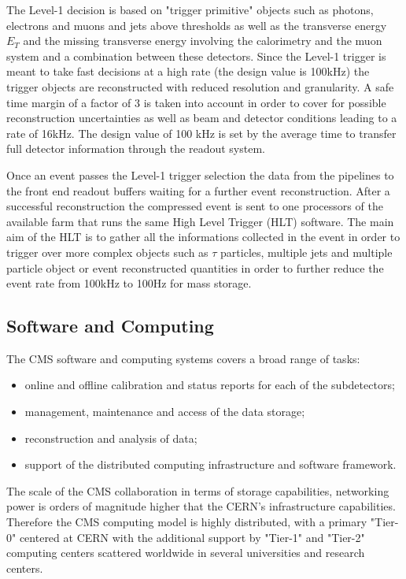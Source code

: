 The Level-1 decision is based on "trigger primitive" objects such as photons, electrons and muons and jets above thresholds as well as the transverse energy $E_{T}$ and the missing transverse energy \met involving the calorimetry and the muon system and a combination between these detectors. Since the Level-1 trigger is meant to take fast decisions at a high rate (the design value is 100kHz) the trigger objects are reconstructed with reduced resolution and granularity. A safe time margin of a factor of 3 is taken into account in order to cover for possible reconstruction uncertainties as well as beam and detector conditions leading to a rate of 16kHz. The design value of 100 kHz is set by the average time to transfer full detector information through the readout system.

Once an event passes the Level-1 trigger selection the data from the pipelines to the front end readout buffers waiting for a further event reconstruction. After a successful reconstruction the compressed event is sent to one processors of the available farm that runs the same High Level Trigger (HLT) software. The main aim of the HLT is to gather all the informations collected in the event in order to trigger over more complex objects such as $\tau$ particles, multiple jets and multiple particle object or event reconstructed quantities in order to further reduce the event rate from 100kHz to 100Hz for mass storage.

\clearpage

\subsection{Software and Computing}

The CMS software and computing systems covers a broad range of tasks:

\begin{itemize}
	\item online and offline calibration and status reports for each of the subdetectors;
	\item management, maintenance and access of the data storage;
	\item reconstruction and analysis of data;
	\item support of the distributed computing infrastructure and software framework.
\end{itemize}

The scale of the CMS collaboration in terms of storage capabilities, networking power is orders of magnitude higher that the CERN's infrastructure capabilities. Therefore the CMS computing model is highly distributed, with a primary "Tier-0" centered at CERN with the additional support by "Tier-1" and "Tier-2" computing centers scattered worldwide in several universities and research centers. 

